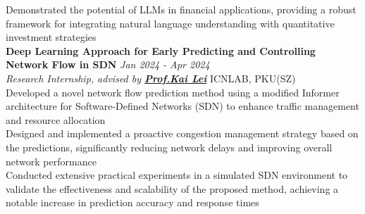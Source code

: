 \documentclass[a4paper,8pt]{article}
\begin{document}
\textbullet Demonstrated the potential of LLMs in financial applications, providing a robust framework for integrating natural language understanding with quantitative investment strategies\\
\textbf{Deep Learning Approach for Early Predicting and Controlling Network Flow in SDN} \hfill \textit{Jan 2024 - Apr 2024}\\
\textit{Research Internship, advised by \textbf{\href{https://scholar.google.com/citations?user=xOs3daIAAAAJ&hl=en}{Prof.\@ Kai Lei}}} \hfill ICNLAB, PKU(SZ)\\
\textbullet Developed a novel network flow prediction method using a modified Informer architecture for Software-Defined Networks (SDN) to enhance traffic management and resource allocation\\
\textbullet Designed and implemented a proactive congestion management strategy based on the predictions, significantly reducing network delays and improving overall network performance\\
\textbullet Conducted extensive practical experiments in a simulated SDN environment to validate the effectiveness and scalability of the proposed method, achieving a notable increase in prediction accuracy and response times
\end{document}
